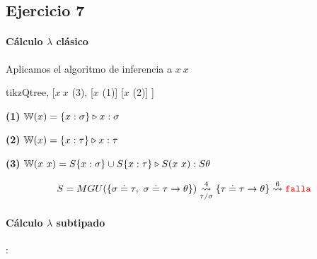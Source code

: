 \documentclass[10pt,a4paper, landscape]{article}
\begin{document}
	\newpage
	\subsection{Ejercicio 7}
	\paragraph{Cálculo $\lambda$ clásico} Aplicamos el algoritmo de inferencia a $x~x$
	
	\vspace*{5mm}
	\setlength{\columnsep}{-5cm}
	\begin{multicols}{2}
		\begin{center}
			\begin{forest} tikzQtree,
				[$x~x$ (3),
				[$x$ (1)]
				[$x$ (2)]
				]
			\end{forest}
			
		\end{center}
		
		\vfill\null
		\columnbreak
		
		\textbf{(1)} $\WFunc(x) = \judgeType{\{x:\sigma\}}{x}{\sigma}$
		
		\textbf{(2)} $\WFunc(x) = \judgeType{\{x:\tau\}}{x}{\tau}$
		
		\textbf{(3)} $\WFunc(x~x) = \judgeType{S\{x:\sigma\}\cup S\{x:\tau\} }{S(x~x)}{S\theta}$
		
		\begin{align*}
		S = MGU(\{\sigma\doteq\tau,~\sigma\doteq \tau \to \theta\}) \goesTo{4}{\tau/\sigma}\{\tau\doteq \tau \to \theta\} \goesTo{6}{} \falla
		\end{align*}
	\end{multicols}
	\setlength{\columnsep}{-1cm}
	
	\paragraph{Cálculo $\lambda$ subtipado}:
	
\end{document}
